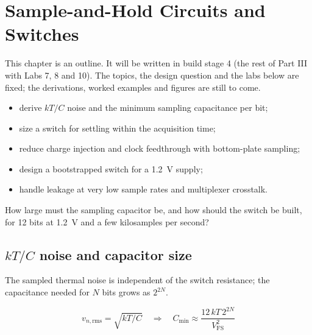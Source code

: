 \chapter{Sample-and-Hold Circuits and Switches}\label{ch:switches}

\begin{specnote}
This chapter is an outline. It will be written in build stage 4 (the rest of Part III with Labs 7, 8 and 10). The topics, the design question and the labs below are fixed; the derivations, worked examples and figures are still to come.
\end{specnote}

\begin{objectives}
\begin{itemize}
  \item derive $kT/C$ noise and the minimum sampling capacitance per bit;
  \item size a switch for settling within the acquisition time;
  \item reduce charge injection and clock feedthrough with bottom-plate sampling;
  \item design a bootstrapped switch for a \qty{1.2}{\volt} supply;
  \item handle leakage at very low sample rates and multiplexer crosstalk.
\end{itemize}
\end{objectives}

\begin{insight}
How large must the sampling capacitor be, and how should the switch be built, for 12 bits at \qty{1.2}{\volt} and a few kilosamples per second?
\end{insight}

\section{\texorpdfstring{$kT/C$}{kT/C} noise and capacitor size}\label{sec:ch15-1}
The sampled thermal noise is independent of the switch resistance; the capacitance needed for $N$ bits grows as $2^{2N}$.

\begin{keyeq}
\begin{equation}
  v_{n,\mathrm{rms}} = \sqrt{kT/C} \quad\Rightarrow\quad C_{\min} \approx \frac{12\,kT\,2^{2N}}{V_{\mathrm{FS}}^2}
  \label{eq:ktc}
\end{equation}
\end{keyeq}

